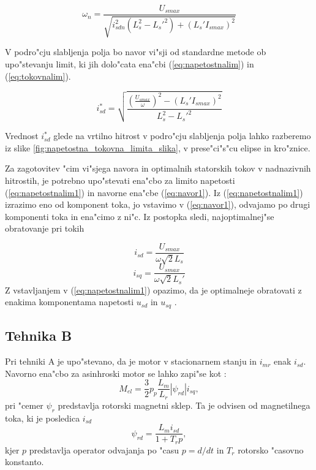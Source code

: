 \documentclass[journal,a4paper,twoside]{sty/IEEEtran}
\begin{document}
\begin{equation}
\omega_n=\frac{{U}_{smax}}{\sqrt{i_{sdn}^{2}(L_s^2-L_s'^2)+(L_s'I_{smax})^2}}
\label{nazivnaw}
\end{equation}



V podro"cju slabljenja polja bo navor vi"sji od standardne metode ob upo"stevanju limit, ki jih dolo"cata ena"cbi (\ref{eq:napetostnalim}) in (\ref{eq:tokovnalim}). 

\begin{equation}
\label{eq:zeljentok1}
i_{sd}^*=\sqrt{\frac{(\frac{U_{smax}}{\omega})^2-(L_s'I_{smax})^2}{L_s^2-L_s'^2}}
\end{equation}

Vrednost $i_{sd}^*$ glede na vrtilno hitrost v podro"cju slabljenja polja lahko razberemo iz slike \ref{fig:napetostna_tokovna_limita_slika}, v prese"ci"s"cu elipse in kro"znice. 

Za zagotovitev "cim vi"sjega navora in optimalnih statorskih tokov v nadnazivnih hitrostih, je potrebno upo"stevati ena"cbo za limito napetosti (\ref{eq:napetostnalim1}) in navorne ena"cbe (\ref{eq:navor1}). Iz (\ref{eq:napetostnalim1}) izrazimo eno od komponent toka, jo vstavimo v (\ref{eq:navor1}), odvajamo po drugi komponenti toka in ena"cimo z ni"c. Iz postopka sledi, najoptimalnej"se obratovanje pri tokih

\begin{equation}
\label{eq:optimum_d}
i_{sd}=\frac{U_{smax}}{\omega \sqrt{2}L_s}
\end{equation} 
\begin{equation}
\label{eq:optimum_q}
i_{sq}=\frac{U_{smax}}{\omega \sqrt{2}L_s'}
\end{equation} 
Z vstavljanjem v (\ref{eq:napetostnalim1}) opazimo, da je optimalneje obratovati z enakima komponentama napetosti $u_{sd}$ in $u_{sq}$ \cite{vas}.

\subsection{Tehnika B}
\label{sec:druga_metoda}

Pri tehniki A je upo"stevano, da je motor v stacionarnem stanju in $i_{mr}$ enak $i_{sd}$.
Navorno ena"cbo za asinhroski motor se lahko zapi"se kot \cite{servopogoni}:
\begin{equation}
\label{eq:navor2}
M_{el}=\frac{3}{2}p_p \frac{L_m}{L_r}|\psi_{rd}|i_{sq},
\end{equation}
pri "cemer $\psi_{r}$ predstavlja rotorski magnetni sklep. Ta je odvisen od magnetilnega toka, ki je posledica $i_{sd}$
\begin{equation}
\label{eq:flux}
\psi_{rd}= \frac{L_m i_{sd}}{1+T_r p},
\end{equation}
kjer $p$ predstavlja operator odvajanja po "casu $p=d/dt$ in $T_r$ rotorsko "casovno konstanto.
\end{document}
